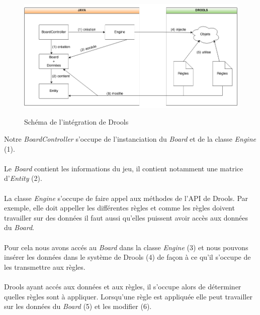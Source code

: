 			\begin{figure}[!h]
			    \caption{Schéma de l'intégration de Drools}
			    \centering
			    \includegraphics[width=\textwidth]{images/architecture/drools_schema_use.png}
			    \label{fig:drools_global_utilisation}
			\end{figure} 

			Notre {\itshape BoardController} s'occupe de l'instanciation du {\itshape Board} et de la classe {\itshape Engine} (1).
			\\ \\
			Le {\itshape Board} contient les informations du jeu, il contient notamment une matrice d'{\itshape Entity} (2).
			\\ \\
			La classe {\itshape Engine} s'occupe de faire appel aux méthodes de l'API de Drools. Par exemple, elle doit appeller les différentes règles et comme les règles doivent travailler sur des données il faut aussi qu'elles puissent avoir accès aux données du {\itshape Board}.
			\\ \\
			Pour cela nous avons accés au {\itshape Board} dans la classe {\itshape Engine} (3) et nous pouvons insérer les données dans le système de Drools (4) de façon à ce qu'il s'occupe de les transmettre aux règles.
			\\ \\
			Drools ayant accés aux données et aux règles, il s'occupe alors de déterminer quelles règles sont à appliquer. Lorsqu'une règle est appliquée elle peut travailler sur les données du {\itshape Board} (5) et les modifier (6). 

